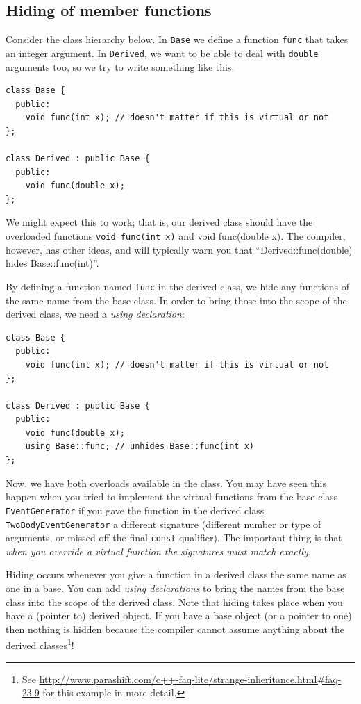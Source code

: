 \documentclass[a4paper]{scrartcl}
\begin{document}
\subsection{Hiding of member functions}
Consider the class hierarchy below. In \verb|Base| we define a function \verb|func| that takes an integer argument. In \verb|Derived|, we want to be able to deal with \verb|double| arguments too, so we try to write something like this:
\begin{verbatim}
class Base {
  public:
    void func(int x); // doesn't matter if this is virtual or not
};

class Derived : public Base {
  public:
    void func(double x);
};
\end{verbatim}

We might expect this to work; that is, our derived class should have the overloaded functions \texttt{void func(int x)} and {void func(double x)}. The compiler, however, has other ideas, and will typically warn you that ``Derived::func(double) hides Base::func(int)''.

By defining a function named \verb|func| in the derived class, we hide any functions of the same name from the base class. In order to bring those into the scope of the derived class, we need a \emph{using declaration}:
\begin{verbatim}
class Base {
  public:
    void func(int x); // doesn't matter if this is virtual or not
};

class Derived : public Base {
  public:
    void func(double x);
    using Base::func; // unhides Base::func(int x)
};
\end{verbatim}

Now, we have both overloads available in the class. You may have seen this happen when you tried to implement the virtual functions from the base class \verb|EventGenerator| if you gave the function in the derived class \verb|TwoBodyEventGenerator| a different signature (different number or type of arguments, or missed off the final \verb|const| qualifier). The important thing is that \emph{when you override a virtual function the signatures must match exactly}.

Hiding occurs whenever you give a function in a derived class the same name as one in a base. You can add \emph{using declarations} to bring the names from the base class into the scope of the derived class. Note that hiding takes place when you have a (pointer to) derived object. If you have a base object (or a pointer to one) then nothing is hidden because the compiler cannot assume anything about the derived classes\footnote{See \url{http://www.parashift.com/c++-faq-lite/strange-inheritance.html\#faq-23.9} for this example in more detail.}!
\end{document}

